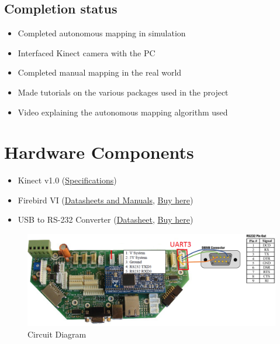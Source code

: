 \documentclass[a4paper,12pt,oneside]{book}
\begin{document}
\subsection*{Completion status}
\begin{itemize}
	\item Completed autonomous mapping in simulation
	\item Interfaced Kinect camera with the PC
	\item Completed manual mapping in the real world
	\item Made tutorials on the various packages used in the project
	\item Video explaining the autonomous mapping algorithm used
\end{itemize}

\section{Hardware Components}
\begin{itemize}  
  \item Kinect v1.0 (\href{https://en.wikipedia.org/wiki/Kinect#Kinect_for_Xbox_360_.28V1_2010.29}{Specifications})
  
  \item Firebird VI (\href{https://github.com/eYSIP-2017/eYSIP-2017_Indoor-Environments-Mapping-using-UAV/tree/master/Documents/Firebird-VI}{Datasheets and Manuals}, \href{http://www.nex-robotics.com/products/fire-bird-vi-robot/fire-bird-vi-robotic-research-platform.html}{Buy here})
  
  \item USB to RS-232 Converter (\href{{./datasheet/USB to RS-232 Converter.pdf}}{Datasheet}, \href{http://www.nex-robotics.com/products/usb-interfacing/usb-to-rs-232-converter.html}{Buy here})  	
\end{itemize}

\begin{figure}[h]
	\centering
	\includegraphics[scale=0.25]{circuit}
	\caption{Circuit Diagram}
\end{figure}
\end{document}
